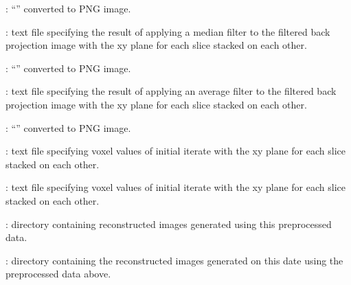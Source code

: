 \begin{tcbfunctionenv}
\begin{tcbparagraph}
\begin{deepList}[labelindent=1pt, leftmargin=*]
\begin{deepList}[labelindent=1pt, leftmargin=*]
\begin{deepList}[labelindent=1pt, leftmargin=*]
\begin{deepList}[labelindent=1pt, leftmargin=*]
\begin{deepList}[labelindent=1pt, leftmargin=*]
\begin{deepList}[labelindent=1pt, leftmargin=*]
\begin{deepList}[labelindent=1pt, leftmargin=*]
\begin{deepList}[labelindent=1pt, leftmargin=*]
\begin{deepList}[labelindent=1pt, leftmargin=*]
                                        \item {} : ``'' converted to PNG image.
                                        \item {} : text file specifying the result of applying a median filter to the filtered back projection image with the xy plane for each slice stacked on each other.
                                        \item {} : ``'' converted to PNG image.
                                        \item {} : text file specifying the result of applying an average filter to the filtered back projection image with the xy plane for each slice stacked on each other.
                                        \item {} : ``'' converted to PNG image.
                                        \item {} : text file specifying voxel values of initial iterate with the xy plane for each slice stacked on each other.
                                        \item {} : text file specifying voxel values of initial iterate with the xy plane for each slice stacked on each other.
                                        \item {} : directory containing reconstructed images generated using this preprocessed data.
                                        \begin{deepList}[labelindent=1pt, leftmargin=*]
                                            \item {} : directory containing the reconstructed images generated on this date using the preprocessed data above.
                                                \begin{deepList}[labelindent=1pt, leftmargin=*]

\end{deepList}
\end{deepList}
\end{deepList}
\end{deepList}
\end{deepList}
\end{deepList}
\end{deepList}
\end{deepList}
\end{deepList}
\end{deepList}
\end{deepList}
\end{tcbparagraph}
\end{tcbfunctionenv}
